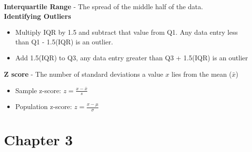 \documentclass[a4paper]{article}
\let\bf\textbf
\begin{document}
\bf{Interquartile Range} - The spread of the middle half of the data.
\vspace{2mm}\\
\bf{Identifying Outliers} 
\begin{itemize}
    \item Multiply IQR by 1.5 and subtract that value from Q1. Any data entry less than Q1 - 1.5(IQR) is an outlier. 
    \item Add 1.5(IQR) to Q3, any data entry greater than Q3 + 1.5(IQR) is an outlier
\end{itemize}
\bf{Z score} - The number of standard deviations a value $x$ lies from the mean ($\bar{x}$)
\begin{itemize}
    \item Sample z-score: $\displaystyle z = \frac{x - \bar{x}}{s}$
    \item Population z-score: $\displaystyle z = \frac{x - \mu}{\sigma}$
\end{itemize}

\section{Chapter 3}
\end{document}
